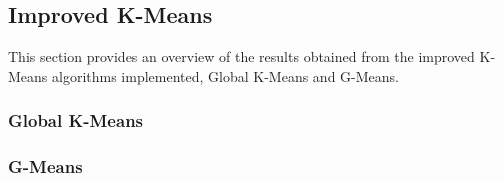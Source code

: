 \subsection{Improved K-Means}
\label{subsec:improvedkmeansresults}

This section provides an overview of the results obtained from the improved K-Means algorithms implemented, Global K-Means and G-Means.

\subsubsection{Global K-Means}
\label{subsec:globalkmeansresults}



\subsubsection{G-Means}
\label{subsec:gmeansresults}



